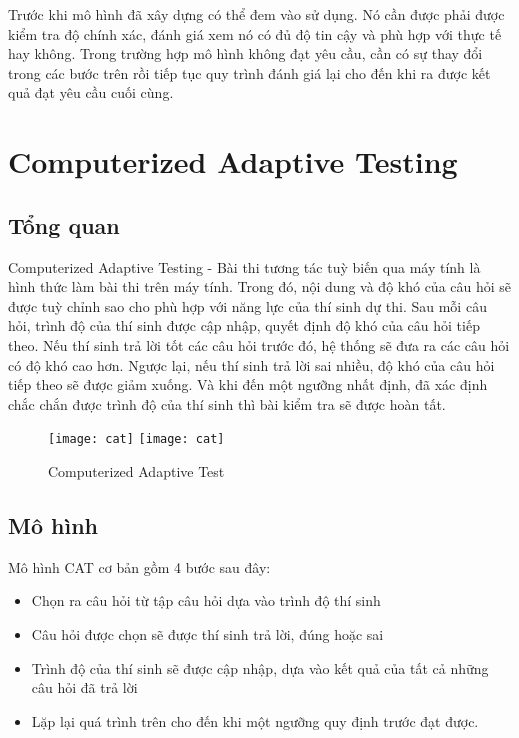 Trước khi mô hình đã xây dựng có thể đem vào sử dụng. Nó cần được phải được kiểm tra độ chính xác, đánh giá xem nó có đủ độ tin cậy và phù hợp với thực tế hay không. Trong trường hợp mô hình không đạt yêu cầu, cần có sự thay đổi trong các bước trên rồi tiếp tục quy trình đánh giá lại cho đến khi ra được kết quả đạt yêu cầu cuối cùng.	

\section{Computerized Adaptive Testing}

\subsection{Tổng quan}
Computerized Adaptive Testing - Bài thi tương tác tuỳ biến qua máy tính là hình thức làm bài thi trên máy tính. Trong đó, nội dung và độ khó của câu hỏi sẽ được tuỳ chỉnh sao cho phù hợp với năng lực của thí sinh dự thi. Sau mỗi câu hỏi, trình độ của thí sinh được cập nhập, quyết định độ khó của câu hỏi tiếp theo. Nếu thí sinh trả lời tốt các câu hỏi trước đó, hệ thống sẽ đưa ra các câu hỏi có độ khó cao hơn. Ngược lại, nếu thí sinh trả lời sai nhiều, độ khó của câu hỏi tiếp theo sẽ được giảm xuống. Và khi đến một ngưỡng nhất định, đã xác định chắc chắn được trình độ của thí sinh thì bài kiểm tra sẽ được hoàn tất.\\

 \begin{figure}[H]
  \begin{center}
    \ifpdf
      \texttt{[image: cat]}
    \else
      \texttt{[image: cat]}
    \fi
    \caption{Computerized Adaptive Test}
    \label{ComputerizeAdaptiveTest}
  \end{center}
\end{figure}

\subsection{Mô hình}
Mô hình CAT cơ bản gồm 4 bước sau đây:
\begin{itemize}
	\item Chọn ra câu hỏi từ tập câu hỏi dựa vào trình độ thí sinh
	\item Câu hỏi được chọn sẽ được thí sinh trả lời, đúng hoặc sai
	\item Trình độ của thí sinh sẽ được cập nhập, dựa vào kết quả của tất cả những câu hỏi đã trả lời
	\item Lặp lại quá trình trên cho đến khi một ngưỡng quy định trước đạt được.
\end{itemize} 

